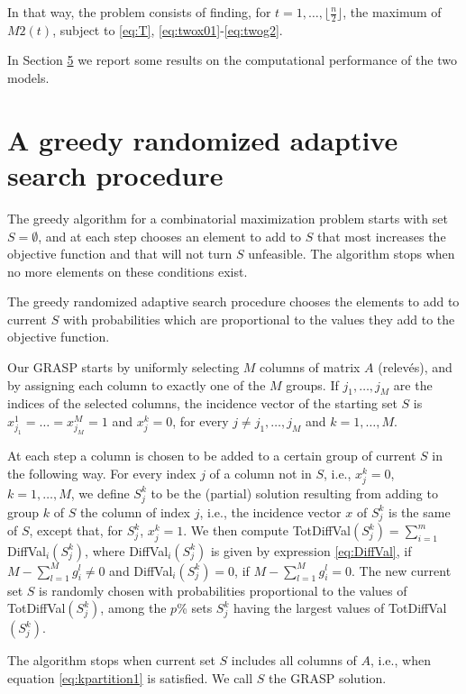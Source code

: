 In that way, the problem consists of finding, for \(t=1,\dots, \lfloor\frac{n}{2}\rfloor\), the maximum of \(M2(t)\), subject to \eqref{eq:T}, \eqref{eq:twox01}-\eqref{eq:twog2}.

In Section \hyperref[implementation]{5} we report some results on the computational performance of the two models.

\section{A greedy randomized adaptive search procedure}\label{GRASP}

The greedy algorithm for a combinatorial maximization problem starts with set \(S=\emptyset\), and at each step chooses an element to add to \(S\) that most increases the objective function and that will not turn \(S\) unfeasible. The algorithm stops when no more elements on these conditions exist.

The greedy randomized adaptive search procedure \citep[GRASP, see][]{FR1995, FR2018} chooses the elements to add to current \(S\) with probabilities which are proportional to the values they add to the objective function.

Our GRASP starts by uniformly selecting \(M\) columns of matrix \(A\) (relevés), and by assigning each column to exactly one of the \(M\) groups. If \(j_1,\dots, j_M\) are the indices of the selected columns, the incidence vector of the starting set \(S\) is \(x_{j_1}^1=\dots=x_{j_M}^M=1\) and \(x_j^k=0\), for every \(j\not=j_1,\dots, j_M\) and \(k=1,\dots,M\).

At each step a column is chosen to be added to a certain group of current \(S\) in the following way. For every index \(j\) of a column not in \(S\), i.e., \(x_j^k=0\), \(k=1,\dots,M\), we define \(S_j^k\) to be the (partial) solution resulting from adding to group \(k\) of \(S\) the column of index \(j\), i.e., the incidence vector \(x\) of \(S_j^k\) is the same of \(S\), except that, for \(S_j^k\), \(x_j^k=1\). We then compute TotDiffVal\((S_j^k)=\sum_{i=1}^m\) DiffVal\(_i(S_j^k)\), where DiffVal\(_i(S_j^k)\) is given by expression \eqref{eq:DiffVal}, if \(M-\sum_{l=1}^M g_i^l\not= 0\) and DiffVal\(_i(S_j^k)=0\), if \(M-\sum_{l=1}^M g_i^l= 0\).
The new current set \(S\) is randomly chosen with probabilities proportional to the values of TotDiffVal\((S_j^k)\), among the \(p\)\% sets \(S_j^k\) having the largest values of TotDiffVal\((S_j^k)\).

The algorithm stops when current set \(S\) includes all columns of \(A\), i.e., when equation \eqref{eq:kpartition1} is satisfied.
We call \(S\) the GRASP solution.

